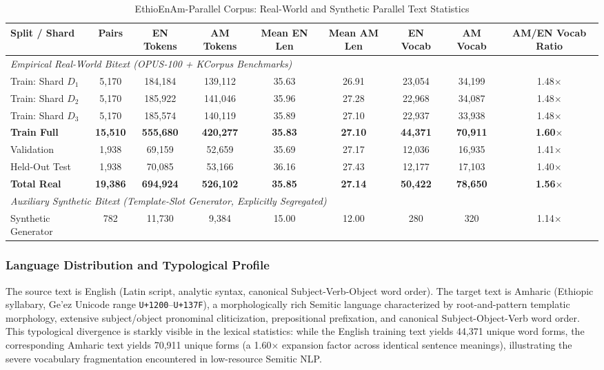 \documentclass[11pt,a4paper]{article}
\begin{document}
\begin{table}[!htbp]
\caption{EthioEnAm-Parallel Corpus: Real-World and Synthetic Parallel Text Statistics}
\label{tab:parallelStats}
\centering
\footnotesize
\setlength{\tabcolsep}{4.5pt}
\begin{tabular}{lcccccccc}
\toprule
\textbf{Split / Shard} & \textbf{Pairs} & \textbf{EN Tokens} & \textbf{AM Tokens} & \textbf{Mean EN Len} & \textbf{Mean AM Len} & \textbf{EN Vocab} & \textbf{AM Vocab} & \textbf{AM/EN Vocab Ratio} \\
\midrule
\multicolumn{9}{l}{\textit{Empirical Real-World Bitext (OPUS-100 + KCorpus Benchmarks)}} \\
Train: Shard $D_1$ & 5,170 & 184,184 & 139,112 & 35.63 & 26.91 & 23,054 & 34,199 & 1.48$\times$ \\
Train: Shard $D_2$ & 5,170 & 185,922 & 141,046 & 35.96 & 27.28 & 22,968 & 34,087 & 1.48$\times$ \\
Train: Shard $D_3$ & 5,170 & 185,574 & 140,119 & 35.89 & 27.10 & 22,937 & 33,938 & 1.48$\times$ \\
\textbf{Train Full} & \textbf{15,510} & \textbf{555,680} & \textbf{420,277} & \textbf{35.83} & \textbf{27.10} & \textbf{44,371} & \textbf{70,911} & \textbf{1.60$\times$} \\
Validation          & 1,938  & 69,159  & 52,659  & 35.69 & 27.17 & 12,036 & 16,935 & 1.41$\times$ \\
Held-Out Test       & 1,938  & 70,085  & 53,166  & 36.16 & 27.43 & 12,177 & 17,103 & 1.40$\times$ \\
\textbf{Total Real} & \textbf{19,386} & \textbf{694,924} & \textbf{526,102} & \textbf{35.85} & \textbf{27.14} & \textbf{50,422} & \textbf{78,650} & \textbf{1.56$\times$} \\
\midrule
\multicolumn{9}{l}{\textit{Auxiliary Synthetic Bitext (Template-Slot Generator, Explicitly Segregated)}} \\
Synthetic Generator & 782 & 11,730 & 9,384 & 15.00 & 12.00 & 280 & 320 & 1.14$\times$ \\
\bottomrule
\end{tabular}
\end{table}

\subsubsection{Language Distribution and Typological Profile}
The source text is English (Latin script, analytic syntax, canonical
Subject-Verb-Object word order).  The target text is Amharic (Ethiopic
syllabary, Ge'ez Unicode range \texttt{U+1200}--\texttt{U+137F}), a
morphologically rich Semitic language characterized by root-and-pattern
templatic morphology, extensive subject/object pronominal cliticization,
prepositional prefixation, and canonical Subject-Object-Verb word order.
This typological divergence is starkly visible in the lexical statistics:
while the English training text yields 44,371 unique word forms, the
corresponding Amharic text yields 70,911 unique forms (a 1.60$\times$
expansion factor across identical sentence meanings), illustrating the
severe vocabulary fragmentation encountered in low-resource Semitic NLP.
\end{document}
